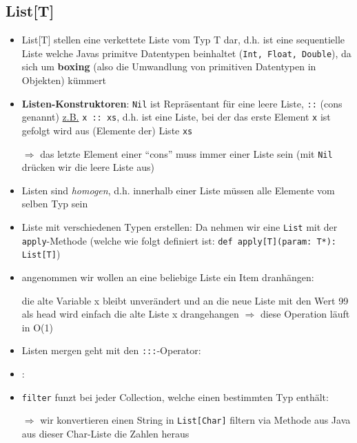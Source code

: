 \subsection{List[T]}
\begin{itemize}
  \item List[T] stellen eine verkettete Liste vom Typ T dar, d.h. ist eine
  sequentielle Liste welche Javas primitve Datentypen beinhaltet 
  (\texttt{Int, Float, Double}), da sich um \textbf{boxing} (also die
  Umwandlung von primitiven Datentypen in Objekten) kümmert
  \item \textbf{Listen-Konstruktoren}: \texttt{Nil} ist Repräsentant für
  eine leere Liste, \texttt{::} (cons genannt) \uline{z.B.} 
  \texttt{x :: xs}, d.h. ist eine Liste, bei der das erste Element \texttt{x}
  ist \und gefolgt wird aus (Elemente der) Liste \texttt{xs}
  
  
  
  $\Rightarrow$ das letzte Element einer \enquote{cons} muss immer einer
  Liste sein (mit \texttt{Nil} drücken wir die leere Liste aus)
  \item Listen sind \textit{homogen}, d.h. innerhalb einer Liste müssen
  alle Elemente vom selben Typ sein
  
  

  \item Liste mit verschiedenen Typen erstellen: Da nehmen wir eine
  \texttt{List} mit der \texttt{apply}-Methode (welche wie folgt definiert
  ist: \texttt{def apply[T](param: T*): List[T]})
  
  
  
  \item angenommen wir wollen an eine beliebige Liste ein Item dranhängen:
  
  
  
  die alte Variable x bleibt unverändert und an die neue Liste mit den Wert
  99 als head wird einfach die alte Liste x drangehangen $\Rightarrow$ 
  diese Operation läuft in O(1)
  \item Listen mergen geht mit den \texttt{:::}-Operator:
  
  
  
  \item {}:
  
  
  
  \item \texttt{filter} funzt bei jeder Collection, welche einen
  bestimmten Typ enthält:
  
  
  
  $\Rightarrow$ wir konvertieren einen String in \texttt{List[Char]} \und 
  filtern via Methode aus Java aus dieser Char-Liste die Zahlen heraus
\end{itemize}
